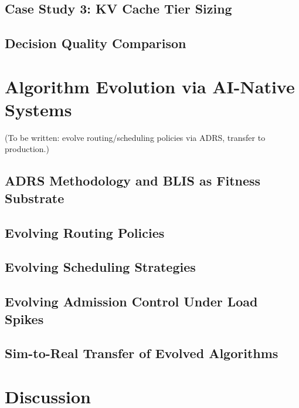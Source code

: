 \documentclass[11pt]{article}
\theoremstyle{plain} %
\theoremstyle{definition} %
\theoremstyle{remark} %
\numberwithin{equation}{section}
\begin{document}
\subsection{Case Study 3: KV Cache Tier Sizing}
\label{subsec:capplan-kvsizing}
\subsection{Decision Quality Comparison}
\label{subsec:capplan-decision}

\section{Algorithm Evolution via AI-Native Systems}
\label{sec:eval-evolution}

(To be written: evolve routing/scheduling policies via ADRS, transfer to production.)

\subsection{ADRS Methodology and BLIS as Fitness Substrate}
\label{subsec:evolution-adrs}
\subsection{Evolving Routing Policies}
\label{subsec:evolution-routing}
\subsection{Evolving Scheduling Strategies}
\label{subsec:evolution-scheduling}
\subsection{Evolving Admission Control Under Load Spikes}
\label{subsec:evolution-admission}
\subsection{Sim-to-Real Transfer of Evolved Algorithms}
\label{subsec:evolution-transfer}

\section{Discussion}
\label{sec:discussion}
\end{document}
